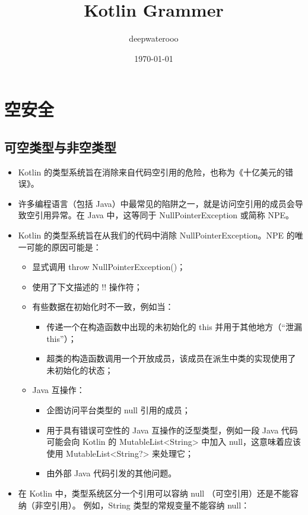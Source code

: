 \documentclass[9pt, b5paper]{article}
\author{deepwaterooo}
\date{\today}
\title{Kotlin Grammer}
\begin{document}
\maketitle
\tableofcontents


\section{空安全}
\label{sec-1}

\subsection{可空类型与非空类型}
\label{sec-1-1}
\begin{itemize}
\item Kotlin 的类型系统旨在消除来自代码空引用的危险，也称为《十亿美元的错误》。
\item 许多编程语言（包括 Java）中最常见的陷阱之一，就是访问空引用的成员会导致空引用异常。在 Java 中，这等同于 NullPointerException 或简称 NPE。
\item Kotlin 的类型系统旨在从我们的代码中消除 NullPointerException。NPE 的唯一可能的原因可能是：
\begin{itemize}
\item 显式调用 throw NullPointerException()；
\item 使用了下文描述的 !! 操作符；
\item 有些数据在初始化时不一致，例如当：
\begin{itemize}
\item 传递一个在构造函数中出现的未初始化的 this 并用于其他地方（“泄漏 this”）；
\item 超类的构造函数调用一个开放成员，该成员在派生中类的实现使用了未初始化的状态；
\end{itemize}
\item Java 互操作：
\begin{itemize}
\item 企图访问平台类型的 null 引用的成员；
\item 用于具有错误可空性的 Java 互操作的泛型类型，例如一段 Java 代码可能会向 Kotlin 的 MutableList<String> 中加入 null，这意味着应该使用 MutableList<String?> 来处理它；
\item 由外部 Java 代码引发的其他问题。
\end{itemize}
\end{itemize}
\item 在 Kotlin 中，类型系统区分一个引用可以容纳 null （可空引用）还是不能容纳（非空引用）。 例如，String 类型的常规变量不能容纳 null：
\end{itemize}
\end{document}
